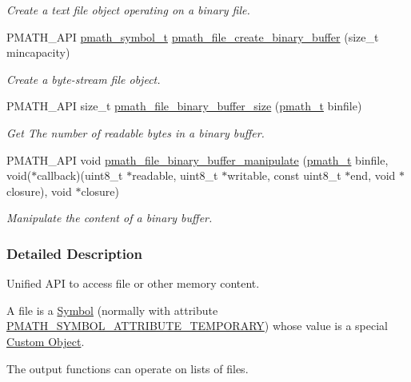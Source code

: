 \begin{CompactItemize}
\begin{CompactList}\small\item\em Create a text file object operating on a binary file. \item\end{CompactList}\item 
PMATH\_\-API \hyperlink{classpmath__symbol__t}{pmath\_\-symbol\_\-t} \hyperlink{group__file__api_g811d829fe964ebbe554c645a0f0f519d}{pmath\_\-file\_\-create\_\-binary\_\-buffer} (size\_\-t mincapacity)
\begin{CompactList}\small\item\em Create a byte-stream file object. \item\end{CompactList}\item 
PMATH\_\-API size\_\-t \hyperlink{group__file__api_gaa064ada946d36bf41ed9908d8176360}{pmath\_\-file\_\-binary\_\-buffer\_\-size} (\hyperlink{classpmath__t}{pmath\_\-t} binfile)
\begin{CompactList}\small\item\em Get The number of readable bytes in a binary buffer. \item\end{CompactList}\item 
PMATH\_\-API void \hyperlink{group__file__api_g9c684b801f150b0485c850cf3649cb16}{pmath\_\-file\_\-binary\_\-buffer\_\-manipulate} (\hyperlink{classpmath__t}{pmath\_\-t} binfile, void($\ast$callback)(uint8\_\-t $\ast$readable, uint8\_\-t $\ast$writable, const uint8\_\-t $\ast$end, void $\ast$closure), void $\ast$closure)
\begin{CompactList}\small\item\em Manipulate the content of a binary buffer. \item\end{CompactList}\end{CompactItemize}


\subsubsection{Detailed Description}
Unified API to access file or other memory content. 

A file is a \hyperlink{group__symbols}{Symbol} (normally with attribute \hyperlink{group__symbols_g5d508ec0d32d617b6c642de54907ee17}{PMATH\_\-SYMBOL\_\-ATTRIBUTE\_\-TEMPORARY}) whose value is a special \hyperlink{group__custom}{Custom Object}.

The output functions can operate on lists of files. 

